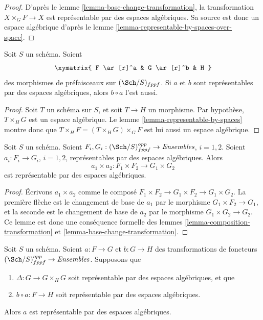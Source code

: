 \begin{proof}
D'après le lemme \ref{lemma-base-change-transformation}, la transformation
$X \times_G F \to X$ est représentable par des espaces algébriques. Sa source est donc
un espace algébrique d'après le
lemme \ref{lemma-representable-by-spaces-over-space}.
\end{proof}

\begin{lemma}
\label{lemma-composition-transformation}
Soit $S$ un schéma.
Soient
$$
\xymatrix{
F \ar[r]^a & G \ar[r]^b & H
}
$$
des morphismes de préfaisceaux sur $(\Sch/S)_{fppf}$.
Si $a$ et $b$ sont représentables par des espaces algébriques, alors
$b \circ a$ l'est aussi.
\end{lemma}

\begin{proof}
Soit $T$ un schéma sur $S$, et soit $T \to H$ un morphisme.
Par hypothèse, $T \times_H G$ est un espace algébrique. Le
lemme \ref{lemma-representable-by-spaces}
montre donc que $T \times_H F = (T \times_H G) \times_G F$ est lui aussi
un espace algébrique.
\end{proof}

\begin{lemma}
\label{lemma-product-transformations}
Soit $S$ un schéma.
Soient $F_i, G_i : (\Sch/S)_{fppf}^{opp} \to \textit{Ensembles}$, $i = 1, 2$.
Soient $a_i : F_i \to G_i$, $i = 1, 2$,
représentables par des espaces algébriques.
Alors
$$
a_1 \times a_2 : F_1 \times F_2 \longrightarrow G_1 \times G_2
$$
est représentable par des espaces algébriques.
\end{lemma}

\begin{proof}
Écrivons $a_1 \times a_2$ comme le composé
$F_1 \times F_2 \to G_1 \times F_2 \to G_1 \times G_2$.
La première flèche est le changement de base de $a_1$ par le morphisme
$G_1 \times F_2 \to G_1$, et la seconde
est le changement de base de $a_2$ par le morphisme
$G_1 \times G_2 \to G_2$. Ce lemme est donc une conséquence formelle des
lemmes \ref{lemma-composition-transformation}
et \ref{lemma-base-change-transformation}.
\end{proof}

\begin{lemma}
\label{lemma-representable-by-spaces-permanence}
Soit $S$ un schéma. Soient $a : F \to G$ et $b : G \to H$ des
transformations de foncteurs $(\Sch/S)_{fppf}^{opp} \to \textit{Ensembles}$.
Supposons que
\begin{enumerate}
\item $\Delta : G \to G \times_H G$ soit représentable
par des espaces algébriques, et que
\item $b \circ a : F \to H$ soit représentable par des espaces algébriques.
\end{enumerate}
Alors $a$ est représentable par des espaces algébriques.
\end{lemma}

